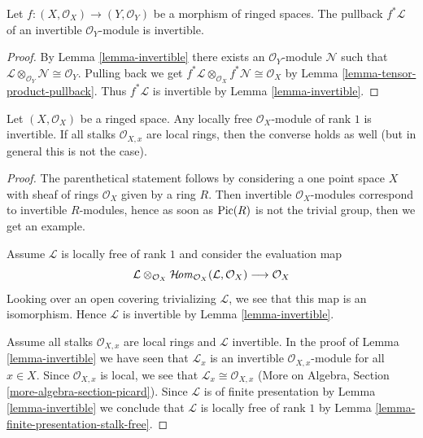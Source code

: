 \begin{lemma}
\label{lemma-pullback-invertible}
Let $f : (X, \mathcal{O}_X) \to (Y, \mathcal{O}_Y)$ be a
morphism of ringed spaces. The pullback $f^*\mathcal{L}$ of an
invertible $\mathcal{O}_Y$-module is invertible.
\end{lemma}

\begin{proof}
By Lemma \ref{lemma-invertible}
there exists an $\mathcal{O}_Y$-module $\mathcal{N}$ such that
$\mathcal{L} \otimes_{\mathcal{O}_Y} \mathcal{N} \cong \mathcal{O}_Y$.
Pulling back we get
$f^*\mathcal{L} \otimes_{\mathcal{O}_X} f^*\mathcal{N} \cong \mathcal{O}_X$
by Lemma \ref{lemma-tensor-product-pullback}.
Thus $f^*\mathcal{L}$ is invertible by Lemma \ref{lemma-invertible}.
\end{proof}

\begin{lemma}
\label{lemma-invertible-is-locally-free-rank-1}
Let $(X, \mathcal{O}_X)$ be a ringed space. Any locally free
$\mathcal{O}_X$-module of rank $1$ is invertible.
If all stalks $\mathcal{O}_{X, x}$ are local rings, then
the converse holds as well (but in general this is not the case).
\end{lemma}

\begin{proof}
The parenthetical statement follows by considering a one point
space $X$ with sheaf of rings $\mathcal{O}_X$ given by a ring $R$.
Then invertible $\mathcal{O}_X$-modules correspond to invertible
$R$-modules, hence as soon as $\mathop{\mathrm{Pic}}\nolimits(R)$ is not the trivial group,
then we get an example.

\medskip\noindent
Assume $\mathcal{L}$ is locally free of rank $1$ and consider the
evaluation map
$$
\mathcal{L} \otimes_{\mathcal{O}_X}
\mathop{\mathcal{H}\!\mathit{om}}\nolimits_{\mathcal{O}_X}(\mathcal{L}, \mathcal{O}_X)
\longrightarrow \mathcal{O}_X
$$
Looking over an open covering trivializing $\mathcal{L}$, we see
that this map is an isomorphism. Hence $\mathcal{L}$ is invertible
by Lemma \ref{lemma-invertible}.

\medskip\noindent
Assume all stalks $\mathcal{O}_{X, x}$ are local rings and $\mathcal{L}$
invertible. In the proof of Lemma \ref{lemma-invertible}
we have seen that $\mathcal{L}_x$ is an invertible
$\mathcal{O}_{X, x}$-module for all $x \in X$. Since
$\mathcal{O}_{X, x}$ is local, we see that
$\mathcal{L}_x \cong \mathcal{O}_{X, x}$
(More on Algebra, Section \ref{more-algebra-section-picard}).
Since $\mathcal{L}$ is of finite presentation by
Lemma \ref{lemma-invertible} we conclude that $\mathcal{L}$
is locally free of rank $1$ by
Lemma \ref{lemma-finite-presentation-stalk-free}.
\end{proof}

